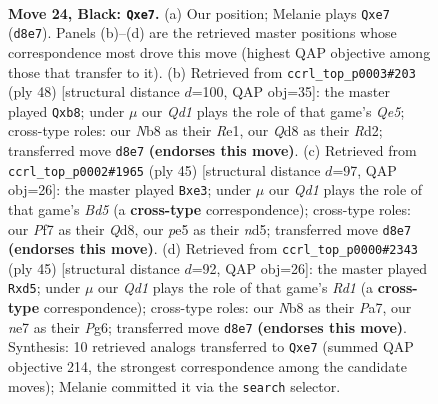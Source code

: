 \documentclass[11pt]{article}
\begin{document}
\clearpage

\begin{figure}[p]\centering
\begin{subfigure}{0.46\textwidth}\centering
\resizebox{\linewidth}{!}{%
\newchessgame
\chessboard[
  setfen={rn1qr1k1/pp2Nppp/8/2P1P3/6b1/P5P1/1P1B1P2/1BRQR1K1 b - - 0 24},
  showmover=false,
  pgfstyle=straightmove, color=movearrow, markmove={d8-e7}
]}
\caption{}
\end{subfigure}\hfill
\begin{subfigure}{0.46\textwidth}\centering
\resizebox{\linewidth}{!}{%
\newchessgame
\chessboard[
  setfen={1q3r1k/5pp1/2p1b2p/3nQ3/1rp4P/2N3P1/1P1R1PB1/4R1K1 w - - 1 25},
  showmover=false,
  pgfstyle=straightmove, color=movearrow, markmove={e5-b8}
]}
\caption{}
\end{subfigure}
\\[4pt]
\begin{subfigure}{0.46\textwidth}\centering
\resizebox{\linewidth}{!}{%
\newchessgame
\chessboard[
  setfen={r2qr1k1/pp3pp1/7p/2nNpP2/3b4/P3B2P/QP3PP1/R2R2K1 b - - 6 23},
  showmover=false,
  pgfstyle=straightmove, color=movearrow, markmove={d4-e3}
]}
\caption{}
\end{subfigure}\hfill
\begin{subfigure}{0.46\textwidth}\centering
\resizebox{\linewidth}{!}{%
\newchessgame
\chessboard[
  setfen={3rr1k1/p4p2/2p3p1/q2Nb2p/8/4B2P/PP1R1PP1/2RQ2K1 b - - 0 23},
  showmover=false,
  pgfstyle=straightmove, color=movearrow, markmove={d8-d5}
]}
\caption{}
\end{subfigure}
\caption{\textbf{Move 24, Black: \texttt{Qxe7}.} (a) Our position; Melanie plays \texttt{Qxe7} (\texttt{d8e7}). Panels (b)--(d) are the retrieved master positions whose correspondence most drove this move (highest QAP objective among those that transfer to it). (b) Retrieved from \texttt{ccrl\_top\_p0003\#203} (ply 48) [structural distance $d$=100, QAP obj=35]: the master played \texttt{Qxb8}; under $\mu$ our \emph{Qd1} plays the role of that game's \emph{Qe5}; cross-type roles: our \emph{N}b8 as their \emph{R}e1, our \emph{Q}d8 as their \emph{R}d2; transferred move \texttt{d8e7} \textbf{(endorses this move)}. (c) Retrieved from \texttt{ccrl\_top\_p0002\#1965} (ply 45) [structural distance $d$=97, QAP obj=26]: the master played \texttt{Bxe3}; under $\mu$ our \emph{Qd1} plays the role of that game's \emph{Bd5} (a \textbf{cross-type} correspondence); cross-type roles: our \emph{P}f7 as their \emph{Q}d8, our \emph{p}e5 as their \emph{n}d5; transferred move \texttt{d8e7} \textbf{(endorses this move)}. (d) Retrieved from \texttt{ccrl\_top\_p0000\#2343} (ply 45) [structural distance $d$=92, QAP obj=26]: the master played \texttt{Rxd5}; under $\mu$ our \emph{Qd1} plays the role of that game's \emph{Rd1} (a \textbf{cross-type} correspondence); cross-type roles: our \emph{N}b8 as their \emph{P}a7, our \emph{n}e7 as their \emph{P}g6; transferred move \texttt{d8e7} \textbf{(endorses this move)}. Synthesis: 10 retrieved analogs transferred to \texttt{Qxe7} (summed QAP objective 214, the strongest correspondence among the candidate moves); Melanie committed it via the \texttt{search} selector.}
\label{fig:thought-m47}
\end{figure}
\end{document}
